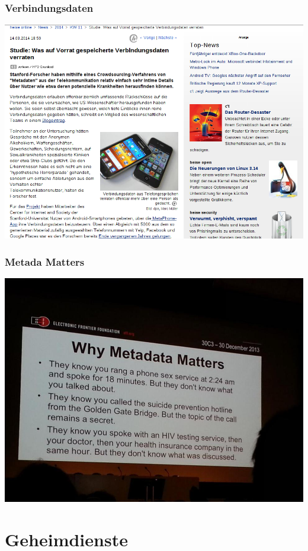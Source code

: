 \documentclass[12pt]{beamer}
\begin{document}
\begin{frame}
  \frametitle{Verbindungsdaten}
  \begin{center}
    \includegraphics[height=0.7\textheight]{img/metadaten_studie.png}
  \end{center}
\end{frame}

\begin{frame}
  \frametitle{Metada Matters}
  \begin{center}
    \includegraphics[height=0.7\textheight]{img/metadata-matters.jpg}
  \end{center}
\end{frame}

\section{Geheimdienste}
\end{document}
